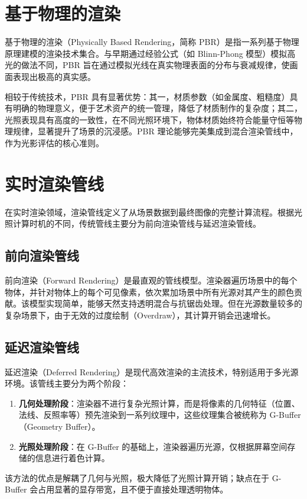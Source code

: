 \section{基于物理的渲染}
基于物理的渲染（Physically Based Rendering，简称 PBR）是指一系列基于物理原理建模的渲染技术集合。与早期通过经验公式（如 Blinn-Phong 模型）模拟高光的做法不同，PBR 旨在通过模拟光线在真实物理表面的分布与衰减规律，使画面表现出极高的真实感。

相较于传统技术，PBR 具有显著优势：其一，材质参数（如金属度、粗糙度）具有明确的物理意义，便于艺术资产的统一管理，降低了材质制作的复杂度；其二，光照表现具有高度的一致性，在不同光照环境下，物体材质始终符合能量守恒等物理规律，显著提升了场景的沉浸感。PBR 理论能够完美集成到混合渲染管线中，作为光影评估的核心准则。

\section{实时渲染管线}
在实时渲染领域，渲染管线定义了从场景数据到最终图像的完整计算流程。根据光照计算时机的不同，传统管线主要分为前向渲染管线与延迟渲染管线。

\subsection{前向渲染管线}
前向渲染（Forward Rendering）是最直观的管线模型。渲染器遍历场景中的每个物体，并针对物体上的每个可见像素，依次累加场景中所有光源对其产生的颜色贡献。该模型实现简单，能够天然支持透明混合与抗锯齿处理。但在光源数量较多的复杂场景下，由于无效的过度绘制（Overdraw），其计算开销会迅速增长。

\subsection{延迟渲染管线}
延迟渲染（Deferred Rendering）是现代高效渲染的主流技术，特别适用于多光源环境。该管线主要分为两个阶段：
\begin{enumerate}
    \item \textbf{几何处理阶段}：渲染器不进行复杂光照计算，而是将像素的几何特征（位置、法线、反照率等）预先渲染到一系列纹理中，这些纹理集合被统称为 G-Buffer（Geometry Buffer）。
    \item \textbf{光照处理阶段}：在 G-Buffer 的基础上，渲染器遍历光源，仅根据屏幕空间存储的信息进行着色计算。
\end{enumerate}
该方法的优点是解耦了几何与光照，极大降低了光照计算开销；缺点在于 G-Buffer 会占用显著的显存带宽，且不便于直接处理透明物体。


